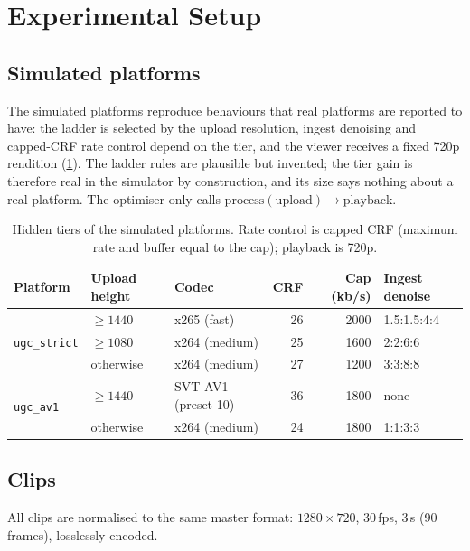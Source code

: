 \section{Experimental Setup}
\label{sec:setup}

\subsection{Simulated platforms}

The simulated platforms reproduce behaviours that real platforms are reported to have: the ladder is
selected by the upload resolution, ingest denoising and capped-CRF rate control depend on the tier,
and the viewer receives a fixed 720p rendition (\cref{tab:platforms}). The ladder rules are
plausible but invented; the tier gain is therefore real in the simulator by construction, and its
size says nothing about a real platform. The optimiser only calls
$\text{process}(\text{upload})\to\text{playback}$.

\begin{table}[t]
  \centering
  \caption{Hidden tiers of the simulated platforms. Rate control is capped CRF (maximum rate and
  buffer equal to the cap); playback is 720p.}
  \label{tab:platforms}
  \small
  \begin{tabular}{@{}lllrrl@{}}
    \toprule
    Platform & Upload height & Codec & CRF & Cap (kb/s) & Ingest denoise \\
    \midrule
    \multirow{3}{*}{\texttt{ugc\_strict}}
      & $\ge 1440$ & x265 (fast)   & 26 & 2000 & 1.5:1.5:4:4 \\
      & $\ge 1080$ & x264 (medium) & 25 & 1600 & 2:2:6:6 \\
      & otherwise  & x264 (medium) & 27 & 1200 & 3:3:8:8 \\
    \midrule
    \multirow{2}{*}{\texttt{ugc\_av1}}
      & $\ge 1440$ & SVT-AV1 (preset 10) & 36 & 1800 & none \\
      & otherwise  & x264 (medium)       & 24 & 1800 & 1:1:3:3 \\
    \bottomrule
  \end{tabular}
\end{table}

\subsection{Clips}

All clips are normalised to the same master format: $1280\times720$, 30\,fps, 3\,s (90 frames),
losslessly encoded.

